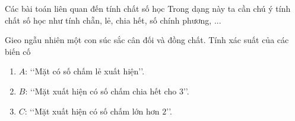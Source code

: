 
\begin{dang}{Các bài toán liên quan đến tính chất số học}
	Trong dạng này ta cần chú ý tính chất số học như tính chẵn, lẻ, chia hết, số chính phương, ...
\end{dang}

\viduminhhoa
\setcounter{vd}{0}
\begin{vd}%
	Gieo ngẫu nhiên một con súc sắc cân đối và đồng chất. Tính xác suất của các biến cố
	\begin{enumerate}
		\item $A$: \lq\lq Mặt có số chấm lẻ xuất hiện\rq\rq.
		\item $B$: \lq\lq Mặt xuất hiện có số chấm chia hết cho $3$\rq\rq.
		\item $C$: \lq\lq Mặt xuất hiện có số chấm lớn hơn $2$\rq\rq.
	\end{enumerate}
\end{vd}

